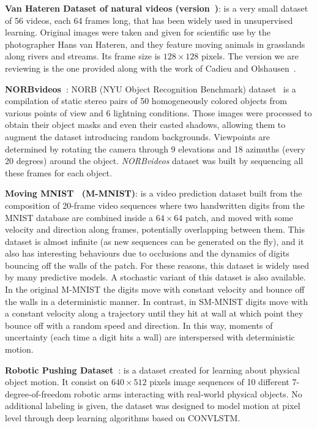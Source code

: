 \vspace*{0.1cm}\noindent\textbf{Van Hateren Dataset of natural videos (version~\cite{Cadieu2012})}: is a very small dataset of \num{56} videos, each \num{64} frames long, that has been widely used in unsupervised learning. Original images were taken and given for scientific use by the photographer Hans van Hateren, and they feature moving animals in grasslands along rivers and streams. Its frame size is $128 \times 128$ pixels. The version we are reviewing is the one provided along with the work of Cadieu and Olshausen~\cite{Cadieu2012}.

\vspace*{0.1cm}\noindent\textbf{NORBvideos~\cite{Memisevic2013}}: NORB (NYU Object Recognition Benchmark) dataset~\cite{LeCun2004} is a compilation of static stereo pairs of 50 homogeneously colored objects from various points of view and 6 lightning conditions. Those images were processed to obtain their object masks and even their casted shadows, allowing them to augment the dataset introducing random backgrounds. Viewpoints are determined by rotating the camera through 9 elevations and 18 azimuths (every 20 degrees) around the object. \textit{NORBvideos} dataset was built by sequencing all these frames for each object.

\vspace*{0.1cm}\noindent\textbf{Moving MNIST~\cite{Srivastava2015} (M-MNIST)}: is a video prediction dataset built from the composition of 20-frame video sequences where two handwritten digits from the MNIST database are combined inside a $64 \times 64$ patch, and moved with some velocity and direction along frames, potentially overlapping between them. This dataset is almost infinite (as new sequences can be generated on the fly), and it also has interesting behaviours due to occlusions and the dynamics of digits bouncing off the walls of the patch. For these reasons, this dataset is widely used by many predictive models. A stochastic variant of this dataset is also available. In the original M-MNIST the digits move with constant velocity and bounce off the walls in a deterministic manner. In contrast, in SM-MNIST digits move with a constant velocity along a trajectory until they hit at wall at which point they bounce off with a random speed and direction. In this way, moments of uncertainty (each time a digit hits a wall) are interspersed with deterministic motion.

\vspace*{0.1cm}\noindent\textbf{Robotic Pushing Dataset~\cite{Finn2016}}: is a dataset created for learning about physical object motion. It consist on $640 \times 512$ pixels image sequences of \num{10} different 7-degree-of-freedom robotic arms interacting with real-world physical objects. No additional labeling is given, the dataset was designed to model motion at pixel level through deep learning algorithms based on \ac{CONVLSTM}.

